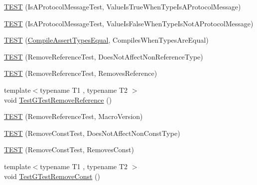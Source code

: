 \begin{DoxyCompactItemize}
\item 
\mbox{\hyperlink{_obj__test_2lib_2googletest-release-1_88_81_2googletest_2test_2gtest__unittest_8cc_ac9103349aa0cc06b769d69f0e8106997}{T\+E\+ST}} (Is\+A\+Protocol\+Message\+Test, Value\+Is\+True\+When\+Type\+Is\+A\+Protocol\+Message)
\item 
\mbox{\hyperlink{_obj__test_2lib_2googletest-release-1_88_81_2googletest_2test_2gtest__unittest_8cc_a5f72b1b55ea8c769dc1c6c182f4d9be2}{T\+E\+ST}} (Is\+A\+Protocol\+Message\+Test, Value\+Is\+False\+When\+Type\+Is\+Not\+A\+Protocol\+Message)
\item 
\mbox{\hyperlink{_obj__test_2lib_2googletest-release-1_88_81_2googletest_2test_2gtest__unittest_8cc_aae9a7c282222598d5d254cf470c9a45b}{T\+E\+ST}} (\mbox{\hyperlink{structtesting_1_1internal_1_1_compile_assert_types_equal}{Compile\+Assert\+Types\+Equal}}, Compiles\+When\+Types\+Are\+Equal)
\item 
\mbox{\hyperlink{_obj__test_2lib_2googletest-release-1_88_81_2googletest_2test_2gtest__unittest_8cc_a3a7ab4954eeaf0889269b56ca3df558e}{T\+E\+ST}} (Remove\+Reference\+Test, Does\+Not\+Affect\+Non\+Reference\+Type)
\item 
\mbox{\hyperlink{_obj__test_2lib_2googletest-release-1_88_81_2googletest_2test_2gtest__unittest_8cc_ae15336b18be29c1317624a2ffdb74530}{T\+E\+ST}} (Remove\+Reference\+Test, Removes\+Reference)
\item 
{\footnotesize template$<$typename T1 , typename T2 $>$ }\\void \mbox{\hyperlink{_obj__test_2lib_2googletest-release-1_88_81_2googletest_2test_2gtest__unittest_8cc_adb1f904a1a5761796ac803fdf4f203a5}{Test\+G\+Test\+Remove\+Reference}} ()
\item 
\mbox{\hyperlink{_obj__test_2lib_2googletest-release-1_88_81_2googletest_2test_2gtest__unittest_8cc_a742fff74857242801058ef6d192b1910}{T\+E\+ST}} (Remove\+Reference\+Test, Macro\+Version)
\item 
\mbox{\hyperlink{_obj__test_2lib_2googletest-release-1_88_81_2googletest_2test_2gtest__unittest_8cc_a553d6725457e4b4e9d89d60f0cc58470}{T\+E\+ST}} (Remove\+Const\+Test, Does\+Not\+Affect\+Non\+Const\+Type)
\item 
\mbox{\hyperlink{_obj__test_2lib_2googletest-release-1_88_81_2googletest_2test_2gtest__unittest_8cc_aa9be3d92628cb49887909ae2c75a231b}{T\+E\+ST}} (Remove\+Const\+Test, Removes\+Const)
\item 
{\footnotesize template$<$typename T1 , typename T2 $>$ }\\void \mbox{\hyperlink{_obj__test_2lib_2googletest-release-1_88_81_2googletest_2test_2gtest__unittest_8cc_a925cffc2731cce684bfcd82858eac00b}{Test\+G\+Test\+Remove\+Const}} ()

\end{DoxyCompactItemize}
